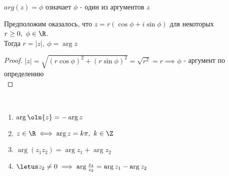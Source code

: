 \begin{defn}
    $arg(z) = \phi$ означает $\phi$ - один из аргументов $z$
\end{defn}

\begin{notice}
    Предположим оказалось, что $z = r(\cos\phi + i\sin\phi)$ для некоторых $r \geq 0,~\phi \in \R$.\\
    Тогда $r = |z|,~\phi = \arg z$
\end{notice}

\begin{proof}
    $|z| = \sqrt{(r\cos\phi)^2 + (r\sin\phi)^2} = \sqrt{r^2} = r \implies \phi$ - аргумент по определению\\
\end{proof}

\begin{theorem-non}~
    \begin{enumerate}
        \item $\arg \oln{z} = -\arg z$
        \item $z \in \R \iff \arg z = k \pi,~k \in \Z$
        \item $\arg(z_1 z_2) = \arg z_1 + \arg z_2$
        \item $\letus z_2 \neq 0 \implies \arg \frac{z_1}{z_2} = \arg z_1 - \arg z_2$
    \end{enumerate}
\end{theorem-non}

